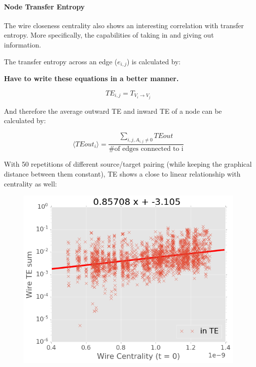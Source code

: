 \documentclass[%
 reprint,
 amsmath,amssymb,
 aps,
]{revtex4-2}
\begin{document}
\paragraph{Node Transfer Entropy}
The wire closeness centrality also shows an interesting correlation with transfer entropy. More specifically, the capabilities of taking in and giving out information. 

The transfer entropy across an edge ($e_{i,j}$) is calculated by:

\textbf{Have to write these equations in a better manner.}

\begin{equation}
TE_{i,j} = T_{V_i \rightarrow V_j}
\end{equation}

And therefore the average outward TE and inward TE of a node can be calculated by:

\begin{equation}
\langle TEout_i \rangle = \frac{\sum \limits_{i,j, A_{i,j} \neq 0} TEout}{\text{\# of edges connected to i}}
\end{equation}

With 50 repetitions of different source/target pairing (while keeping the graphical distance between them constant), TE shows a close to linear relationship with centrality as well:

\begin{figure}[h]
	\centering
	\includegraphics[width=1\linewidth]{figure/in_TE}
	\caption{}
	\label{fig:in_te}
\end{figure}
\end{document}
